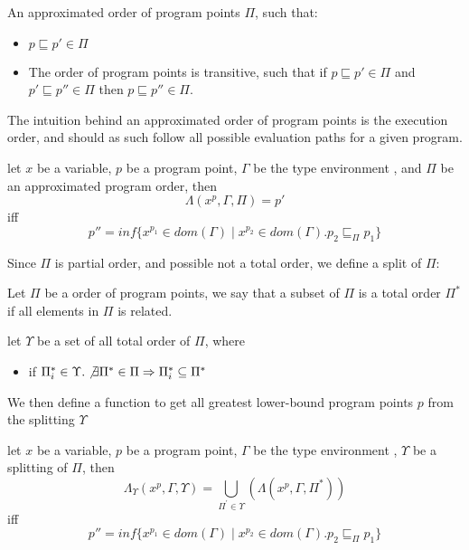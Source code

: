 \documentclass[../../master.tex]{subfiles}
\begin{document}
\begin{definition}
	An approximated order of program points $\Pi$, such that: 
	\begin{itemize}
		\item  $p\sqsubseteq p'\in\Pi$
		\item The order of program points is transitive, such that if $p\sqsubseteq p'\in\Pi$ and $p'\sqsubseteq p''\in\Pi$ then $p\sqsubseteq p''\in\Pi$.
	\end{itemize}
\end{definition}
The intuition behind an approximated order of program points is the execution order, and should as such follow all possible evaluation paths for a given program.

\begin{definition}
	let $x$ be a variable, $p$ be a program point, $\Gamma$ be the type environment , and $\Pi$ be an approximated program order, then
	$$\Lambda(x^p, \Gamma, \Pi)=p'$$
	iff
	$$p'' = inf\{x^{p_1}\in dom(\Gamma)\mid x^{p_2}\in dom(\Gamma).p_2\sqsubseteq_\Pi p_1\}$$
\end{definition}

Since $\Pi$ is partial order, and possible not a total order, we define a split of $\Pi$:

\begin{definition}
	Let $\Pi$ be a order of program points, we say that a subset of $\Pi$ is a total order $\Pi^{*}$ if all elements in $\Pi$ is related.
\end{definition}

\begin{definition}
	let $\Upsilon$ be a set of all total order of $\Pi$, where
	\begin{itemize}
		\item if $\Pi^{*}_i\in\Upsilon.\not\exists \Pi^{*}\in\Pi\Rightarrow\Pi^{*}_i\subseteq\Pi^{*}$
	\end{itemize}
\end{definition}

We then define a function to get all greatest lower-bound program points $p$ from the splitting $\Upsilon$
\begin{definition}
	let $x$ be a variable, $p$ be a program point, $\Gamma$ be the type environment , $\Upsilon$ be a splitting of $\Pi$, then
	$$\Lambda_\Upsilon(x^p, \Gamma, \Upsilon)=\bigcup_{\Pi^{'}\in\Upsilon}(\Lambda(x^p,\Gamma,\Pi^{*}))$$
	iff
	$$p'' = inf\{x^{p_1}\in dom(\Gamma)\mid x^{p_2}\in dom(\Gamma).p_2\sqsubseteq_\Pi p_1\}$$
\end{definition}
\end{document}
